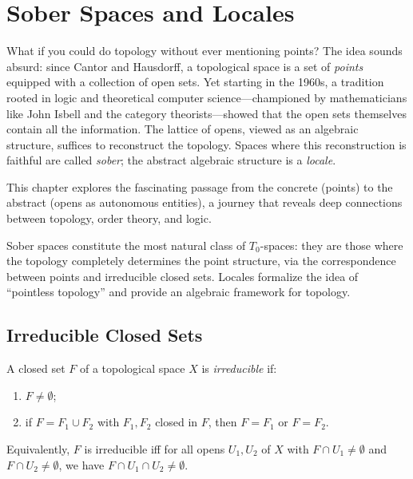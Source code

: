 \chapter{Sober Spaces and Locales}
\label{ch:sober_locales}

What if you could do topology without ever mentioning points? The idea sounds absurd: since Cantor and Hausdorff, a topological space is a set of \emph{points} equipped with a collection of open sets. Yet starting in the 1960s, a tradition rooted in logic and theoretical computer science---championed by mathematicians like John Isbell and the category theorists---showed that the open sets themselves contain all the information. The lattice of opens, viewed as an algebraic structure, suffices to reconstruct the topology. Spaces where this reconstruction is faithful are called \emph{sober}; the abstract algebraic structure is a \emph{locale}.

This chapter explores the fascinating passage from the concrete (points) to the abstract (opens as autonomous entities), a journey that reveals deep connections between topology, order theory, and logic.

\begin{intuition}
Sober spaces constitute the most natural class of $T_0$-spaces: they are those where the
topology completely determines the point structure, via the correspondence between points
and irreducible closed sets. Locales formalize the idea of ``pointless topology'' and
provide an algebraic framework for topology.
\end{intuition}

\section{Irreducible Closed Sets}

\begin{definition}
A closed set $F$ of a topological space $X$ is \emph{irreducible} if:
\begin{enumerate}
  \item $F \neq \emptyset$;
  \item if $F = F_1 \cup F_2$ with $F_1, F_2$ closed in $F$, then $F = F_1$ or $F = F_2$.
\end{enumerate}
Equivalently, $F$ is irreducible iff for all opens $U_1, U_2$ of $X$ with
$F \cap U_1 \neq \emptyset$ and $F \cap U_2 \neq \emptyset$, we have
$F \cap U_1 \cap U_2 \neq \emptyset$.
\end{definition}

